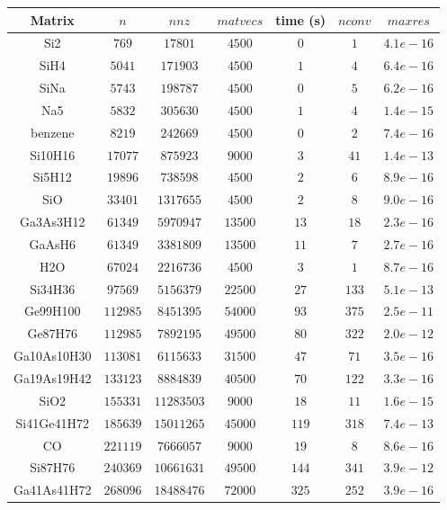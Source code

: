 \begin{tabular}{c|c|c|c|c|c|c}
Matrix & $n$ & $nnz$ & $matvecs$ & time (s) & $nconv$ & $maxres$ \\\hline
Si2 & $769$ & $17801$ & $4500$ & $0$ & $1$ & $4.1e-16$ \\
SiH4 & $5041$ & $171903$ & $4500$ & $1$ & $4$ & $6.4e-16$ \\
SiNa & $5743$ & $198787$ & $4500$ & $0$ & $5$ & $6.2e-16$ \\
Na5 & $5832$ & $305630$ & $4500$ & $1$ & $4$ & $1.4e-15$ \\
benzene & $8219$ & $242669$ & $4500$ & $0$ & $2$ & $7.4e-16$ \\
Si10H16 & $17077$ & $875923$ & $9000$ & $3$ & $41$ & $1.4e-13$ \\
Si5H12 & $19896$ & $738598$ & $4500$ & $2$ & $6$ & $8.9e-16$ \\
SiO & $33401$ & $1317655$ & $4500$ & $2$ & $8$ & $9.0e-16$ \\
Ga3As3H12 & $61349$ & $5970947$ & $13500$ & $13$ & $18$ & $2.3e-16$ \\
GaAsH6 & $61349$ & $3381809$ & $13500$ & $11$ & $7$ & $2.7e-16$ \\
H2O & $67024$ & $2216736$ & $4500$ & $3$ & $1$ & $8.7e-16$ \\
Si34H36 & $97569$ & $5156379$ & $22500$ & $27$ & $133$ & $5.1e-13$ \\
Ge99H100 & $112985$ & $8451395$ & $54000$ & $93$ & $375$ & $2.5e-11$ \\
Ge87H76 & $112985$ & $7892195$ & $49500$ & $80$ & $322$ & $2.0e-12$ \\
Ga10As10H30 & $113081$ & $6115633$ & $31500$ & $47$ & $71$ & $3.5e-16$ \\
Ga19As19H42 & $133123$ & $8884839$ & $40500$ & $70$ & $122$ & $3.3e-16$ \\
SiO2 & $155331$ & $11283503$ & $9000$ & $18$ & $11$ & $1.6e-15$ \\
Si41Ge41H72 & $185639$ & $15011265$ & $45000$ & $119$ & $318$ & $7.4e-13$ \\
CO & $221119$ & $7666057$ & $9000$ & $19$ & $8$ & $8.6e-16$ \\
Si87H76 & $240369$ & $10661631$ & $49500$ & $144$ & $341$ & $3.9e-12$ \\
Ga41As41H72 & $268096$ & $18488476$ & $72000$ & $325$ & $252$ & $3.9e-16$ \\
\end{tabular}